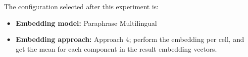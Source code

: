 The configuration selected after this experiment is:
\begin{itemize}
    \item \textbf{Embedding model:} Paraphrase Multilingual
    \item \textbf{Embedding approach:} Approach 4; perform the embedding per
          cell, and get the mean for each component in the result embedding vectors.
\end{itemize}
